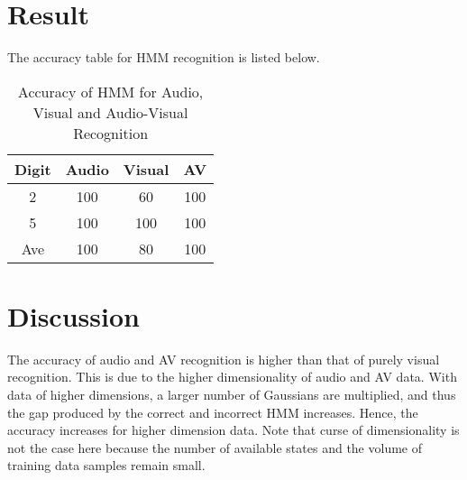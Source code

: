 \documentclass{article}
\begin{document}
	\section{Result}
	The accuracy table for HMM recognition is listed below.	
	\begin{table}[H]
		\centering
		\caption{Accuracy of HMM for Audio, Visual and Audio-Visual Recognition}
		\label{my-label}
		\begin{tabular}{|c|c|c|c|}
			\hline
			Digit & Audio & Visual & AV  \\ \hline
			2     & 100   & 60     & 100 \\ \hline
			5     & 100   & 100    & 100 \\ \hline
			Ave   & 100   & 80     & 100 \\ \hline
		\end{tabular}
	\end{table}
	\section{Discussion}
	The accuracy of audio and AV recognition is higher than that of purely visual recognition. This is due to the higher dimensionality of audio and AV data. With data of higher dimensions, a larger number of Gaussians are multiplied, and thus the gap produced by the correct and incorrect HMM increases. Hence, the accuracy increases for higher dimension data. Note that curse of dimensionality is not the case here because the number of available states and the volume of training data samples remain small.
\end{document}
